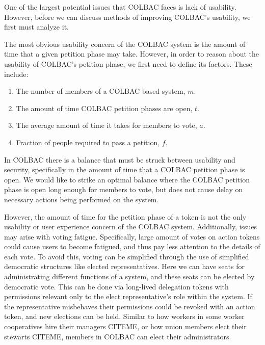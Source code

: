 One of the largest potential issues that COLBAC faces is lack of usability.
However, before we can discuss methods of improving COLBAC's usability, we first
must analyze it. 

The most obvious usability concern of the COLBAC system is the amount of time
that a given petition phase may take. However, in order to reason about the
usability of COLBAC's petition phase, we first need to define its factors. These
include:
\begin{enumerate}
\item The number of members of a COLBAC based system, $m$.
\item The amount of time COLBAC petition phases are open, $t$.
\item The average amount of time it takes for members to vote, $a$.
\item Fraction of people required to pass a petition, $f$.
\end{enumerate}

In COLBAC there is a balance that must be struck between usability and security,
specifically in the amount of time that a COLBAC petition phase is open. We
would like to strike an optimal balance where the COLBAC petition phase is open
long enough for members to vote, but does not cause delay on necessary actions
being performed on the system.

However, the amount of time for the petition phase of a token is not the only
usability or user experience concern of the COLBAC system. Additionally, issues
may arise with voting fatigue. Specifically, large amount of votes on action
tokens could cause users to become fatigued, and thus pay less attention to the
details of each vote. To avoid this, voting can be simplified through the use of
simplified democratic structures like elected representatives. Here we can have
seats for administrating different functions of a system, and these seats can be
elected by democratic vote. This can be done via long-lived delegation tokens
with permissions relevant only to the elect representative's role within the
system. If the representative misbehaves their permissions could be revoked with
an action token, and new elections can be held. Similar to how workers in some
worker cooperatives hire their managers CITEME, or how union members elect their
stewarts CITEME, members in COLBAC can elect their administrators.

